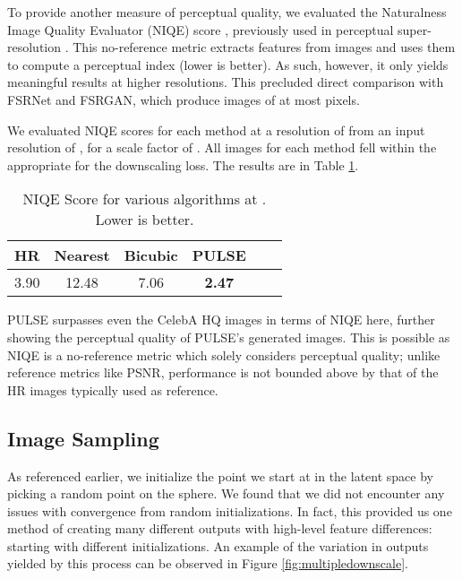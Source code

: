 \documentclass[10pt,twocolumn,letterpaper]{article}
\begin{document}
To provide another measure of perceptual quality, we evaluated the Naturalness Image Quality Evaluator (NIQE) score \cite{NIQE}, previously used in perceptual super-resolution \cite{jeong2015multi,Blau_2018_ECCV_Workshops,esrgan}. This no-reference metric extracts features from images and uses them to compute a perceptual index (lower is better). As such, however, it only yields meaningful results at higher resolutions. This precluded direct comparison with FSRNet and FSRGAN, which produce images of at most  pixels.


We evaluated NIQE scores for each method at a resolution of  from an input resolution of , for a scale factor of . All images for each method fell within the appropriate  for the downscaling loss. The results are in Table \ref{tab:NIQE}.
\begin{table}[]
\small{
\renewcommand{\arraystretch}{1.2}
\begin{tabular}{|c|c|c|c|c|c|}
\hline
HR   & Nearest & Bicubic & PULSE \\ \hline \hline
3.90 & 12.48 & 7.06 & \textbf{2.47}  \\ \hline
\end{tabular}
}
\centering
\caption{NIQE Score for various algorithms at . Lower is better.}
\label{tab:NIQE}
\end{table}
PULSE surpasses even the CelebA HQ images in terms of NIQE here, further showing the perceptual quality of PULSE's generated images. This is possible as NIQE is a no-reference metric which solely considers perceptual quality; unlike reference metrics like PSNR, performance is not bounded above by that of the HR images typically used as reference.







\subsection{Image Sampling}

As referenced earlier, we initialize the point we start at in the latent space by picking a random point on the sphere. We found that we did not encounter any issues with convergence from random initializations. In fact, this provided us one method of creating many different outputs with high-level feature differences: starting with different initializations. An example of the variation in outputs yielded by this process can be observed in Figure \ref{fig:multipledownscale}.
\end{document}
